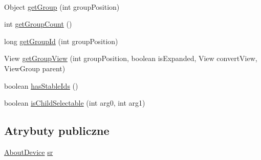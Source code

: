 \begin{DoxyCompactItemize}
$$\item 
Object \hyperlink{classcom_1_1example_1_1qrpoll_1_1_expandable_list_adapter_a3f311ecc161915f1d8a864677d36b752}{get\+Group} (int group\+Position)
\item 
int \hyperlink{classcom_1_1example_1_1qrpoll_1_1_expandable_list_adapter_ab9a9bd19ec9d4209100f8d08b56b2837}{get\+Group\+Count} ()
\item 
long \hyperlink{classcom_1_1example_1_1qrpoll_1_1_expandable_list_adapter_a9e1426065947818273f73aca8a592239}{get\+Group\+Id} (int group\+Position)
\item 
View \hyperlink{classcom_1_1example_1_1qrpoll_1_1_expandable_list_adapter_a6b8e4143490f8afe57b71a6c8ab2b0a4}{get\+Group\+View} (int group\+Position, boolean is\+Expanded, View convert\+View, View\+Group parent)
\item 
boolean \hyperlink{classcom_1_1example_1_1qrpoll_1_1_expandable_list_adapter_a57e5cc39a98135f8082d543188b916ba}{has\+Stable\+Ids} ()
\item 
boolean \hyperlink{classcom_1_1example_1_1qrpoll_1_1_expandable_list_adapter_a8ee7d10766ae8735e4e08ffca424abe3}{is\+Child\+Selectable} (int arg0, int arg1)
\end{DoxyCompactItemize}
\subsection*{Atrybuty publiczne}
\begin{DoxyCompactItemize}
\item 
\hyperlink{classcom_1_1example_1_1qrpoll_1_1_about_device}{About\+Device} \hyperlink{classcom_1_1example_1_1qrpoll_1_1_expandable_list_adapter_a5a2a5fcc6055e9df94314c040efeca1f}{sr}
\end{DoxyCompactItemize}
